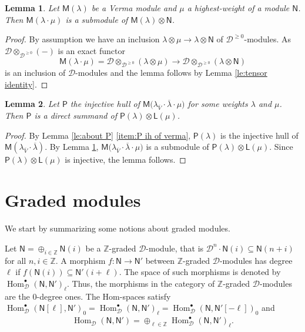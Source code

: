 \documentclass[reqno]{amsart}
\newcommand{\oV}{\overline{V}}
\renewcommand{\_}[1]{_{\left( #1 \right)}}
\renewcommand{\^}[1]{^{\left( #1 \right)}}
\newcommand{\ot}{{\otimes}}
\newcommand\fL{\mathsf{L}}
\newcommand\fM{\mathsf{M}}
\newcommand\fN{\mathsf{N}}
\newcommand\fP{\mathsf{P}}
\newcommand{\Z}{{\mathbb Z}}
\newcommand{\D}{\mathcal{D}}
\newcommand\Hom{\operatorname{Hom}}
\theoremstyle{plain}
\newtheorem{lema}{Lemma}[section]
\theoremstyle{definition}
\theoremstyle{remark}
\begin{document}
\begin{lema}\label{le:verma ot hw}
Let $\fM(\lambda)$ be a Verma module and $\mu$ a highest-weight of a module $\fN$. Then $\fM(\lambda \cdot\mu)$ is a submodule of $\fM(\lambda)\ot\fN$. 
\end{lema}

\begin{proof}
By assumption we have an inclusion $\lambda\ot\mu\longrightarrow\lambda\ot\fN$ of $\D^{\geq0}$-modules. As $\D\ot_{\D^{\geq0}}(-)$ is an exact functor
$$
\fM(\lambda\cdot\mu)=\D\ot_{\D^{\geq0}}(\lambda\ot\mu)\longrightarrow\D\ot_{\D^{\geq0}}(\lambda\ot\fN)
$$ 
is an inclusion of $\D$-modules and the lemma follows by Lemma \ref{le:tensor identity}.
\end{proof}

\begin{lema}\label{le:P ot hw}
Let $\fP$ the injective hull of $\fM\bigl(\lambda_{\oV}\cdot\overline{\lambda}\cdot\mu\bigr)$ for some weights $\lambda$ and $\mu$. Then $\fP$ is a direct summand of $\fP(\lambda)\ot\fL(\mu)$.
\end{lema}

\begin{proof}
By Lemma \ref{le:about P} \ref{item:P ih of verma}, $\fP(\lambda)$ is the injective hull of $\fM(\lambda_{\oV}\cdot\overline{\lambda})$. By Lemma \ref{le:verma ot hw}, $\fM\bigl(\lambda_{\oV}\cdot\overline{\lambda}\cdot\mu\bigr)$ is a submodule of $\fP(\lambda)\ot\fL(\mu)$. Since $\fP(\lambda)\ot\fL(\mu)$ is injective, the lemma follows.
\end{proof}


\section{Graded modules}\label{sec:characters}

We start by summarizing some notions about graded modules. 

Let $\fN=\oplus_{i\in\Z}\fN(i)$ be a $\Z$-graded $\D$-module, that is $\D^n\cdot\fN(i)\subseteq\fN(n+i)$ for all $n,i\in\Z$. A morphism $f:\fN\longrightarrow\fN'$ between $\Z$-graded $\D$-modules has degree $\ell$ if $f(\fN(i))\subseteq\fN'(i+\ell)$. The space of such morphisms is denoted by $\Hom^\bullet_{\D}(\fN,\fN')_{\ell}$. Thus, the morphisms in the category of $\Z$-graded $\D$-modules are the $0$-degree ones. The Hom-spaces satisfy $\Hom^\bullet_{\D}(\fN[\ell],\fN')_0=\Hom^\bullet_{\D}(\fN,\fN')_{\ell}=\Hom^\bullet_{\D}(\fN,\fN'[-\ell])_0$ and
\begin{align}\label{eq:Hom y Hom gr}
\Hom_{\D}(\fN,\fN')=\oplus_{\ell\in\Z}\Hom^\bullet_{\D}(\fN,\fN')_{\ell}.
\end{align}
\end{document}
